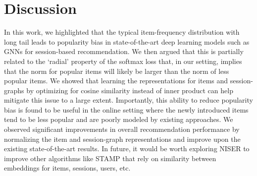 \documentclass[sigconf]{acmart}
\begin{document}
\section{Discussion}
In this work, we highlighted that the typical item-frequency distribution with long tail leads to popularity bias in state-of-the-art deep learning models such as GNNs \cite{wu2018session} for session-based recommendation. 
We then argued that this is partially related to the `radial' property of the softmax loss that, in our setting, implies that the norm for popular items will likely be larger than the norm of less popular items.
We showed that learning the representations for items and session-graphs by optimizing for cosine similarity instead of inner product can help mitigate this issue to a large extent.
Importantly, this ability to reduce popularity bias is found to be useful in the online setting where the newly introduced items tend to be less popular and are poorly modeled by existing approaches.
We observed significant improvements in overall recommendation performance by normalizing the item and session-graph representations and improve upon the existing state-of-the-art results.
In future, it would be worth exploring NISER to improve other algorithms like STAMP \cite{liu2018stamp} that rely on similarity between embeddings for items, sessions, users, etc.



\end{document}
